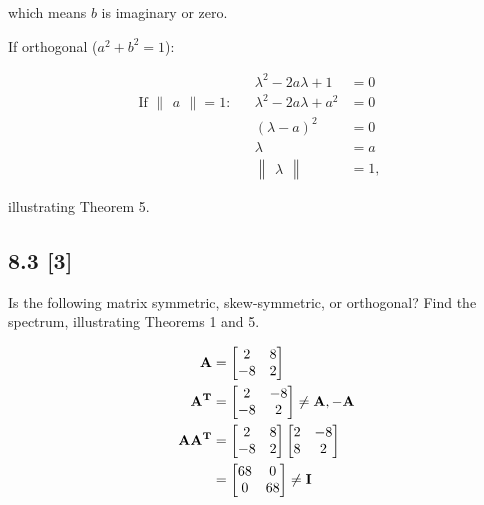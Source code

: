 \documentclass{article}
\begin{document}
which means $b$ is imaginary or zero.

If orthogonal ($a^2 + b^2 = 1$):

\begin{align}
    \label{eq:14}
    && \lambda^2 - 2a\lambda + 1 &= 0
    \\
    \label{eq:15}
    \text{If } \begin{Vmatrix}
    a
    \end{Vmatrix} = 1: && \lambda^2 - 2a\lambda + a^2 &= 0
    \\
    \label{eq:16}
    &&(\lambda-a)^2 &= 0
    \\
    \label{eq:17}
    &&\lambda &= a
    \\
    \label{eq:18}
    &&\begin{Vmatrix}
    \lambda
    \end{Vmatrix} &= 1,
\end{align}

illustrating Theorem 5.

\subsection*{8.3 [3]}
\setcounter{equation}{0}

Is the following matrix symmetric, skew-symmetric, or orthogonal?  Find the spectrum, illustrating Theorems 1 and 5.

\begin{align}
    \label{eq:1}
    && \textbf{A} &= \begin{bmatrix}
    2 & 8\\
    -8 & 2
    \end{bmatrix}
    \\
    \label{eq:2}
    && \textbf{A\textsuperscript{T}} &= \begin{bmatrix}
    2 & -8\\
    -8 & 2
    \end{bmatrix} \neq \textbf{A}, -\textbf{A}
    \\
    \label{eq:3}
    && \textbf{AA\textsuperscript{T}} &= \begin{bmatrix}
    2 & 8\\
    -8 & 2 \end{bmatrix} \begin{bmatrix} 
    2 & -8 \\
    8 & 2 \end{bmatrix}
    \\
    \label{eq:4}
    && &= \begin{bmatrix} 68 & 0 \\ 0 & 68 \end{bmatrix} \neq \textbf{I}
\end{align}
\end{document}
